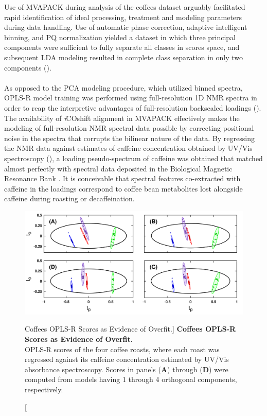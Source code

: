 \begin{doublespace}
Use of MVAPACK during analysis of the coffees dataset arguably facilitated
rapid identification of ideal processing, treatment and modeling parameters
during data handling. Use of automatic phase correction, adaptive intelligent
binning, and PQ normalization yielded a dataset in which three principal
components were sufficient to fully separate all classes in scores space,
and subsequent LDA modeling resulted in complete class separation in only
two components ().
\\\\
As opposed to the PCA modeling procedure, which utilized binned spectra,
OPLS-R model training was performed using full-resolution 1D \hnmr{} NMR
spectra in order to reap the interpretive advantages of full-resolution
backscaled loadings (). The availability of
\emph{i}COshift alignment \cite{savorani:jmr2010} in MVAPACK effectively
makes the modeling of full-resolution NMR spectral data possible by correcting
positional noise \cite{aberg:abc2009} in the spectra that corrupts the bilinear
nature of the data. By regressing the NMR data against estimates of caffeine
concentration obtained by UV/Vis spectroscopy (),
a loading pseudo-spectrum of caffeine was obtained that matched almost
perfectly with spectral data deposited in the Biological Magnetic Resonance
Bank \cite{ulrich:nar2008}. It is conceivable that spectral features
co-extracted with caffeine in the loadings correspond to coffee bean
metabolites lost alongside caffeine during roasting or decaffeination.
\end{doublespace}

\begin{figure}[H]
\includegraphics[width=6.5in]{figs/apps/05-oplsr-t.png}
\caption
      [Coffees OPLS-R Scores as Evidence of Overfit.]{
  {\bf Coffees OPLS-R Scores as Evidence of Overfit.}
  \\
  OPLS-R scores of the four coffee roasts, where each roast was regressed
  against its caffeine concentration estimated by UV/Vis absorbance
  spectroscopy. Scores in panels ({\bf A}) through ({\bf D}) were computed
  from models having 1 through 4 orthogonal components, respectively.
}
\label{figure.4.5}
\end{figure}

